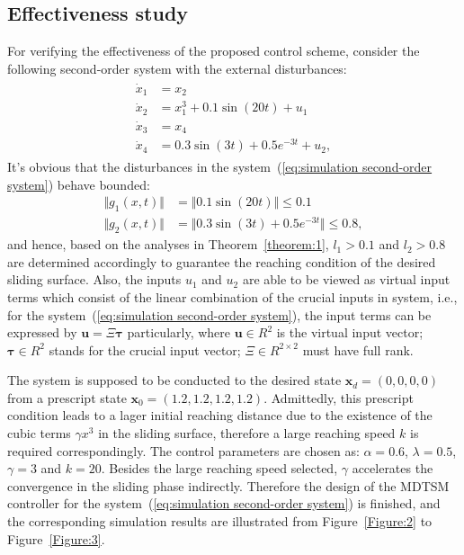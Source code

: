 \documentclass[3p]{elsarticle}
\theoremstyle{plain}
\theoremstyle{remark}
\begin{document}
\subsection{Effectiveness study}
For verifying the effectiveness of the proposed control scheme, consider the following second-order system with the external disturbances:
\begin{align}
\begin{split}
\dot x_1 &= x_2\\
\dot x_2 &= x_1^3+0.1\sin(20t)+u_1\\
\dot x_3 &= x_4\\
\dot x_4 &= 0.3\sin(3t)+0.5e^{-3t}+u_2,\label{eq:simulation second-order system}
\end{split}
\end{align}
It's obvious that the disturbances in the system~(\ref{eq:simulation second-order system}) behave bounded:
\begin{align*}
\Vert g_1(x,t)\Vert &= \Vert 0.1\sin(20t)\Vert\le 0.1\\
\Vert g_2(x,t)\Vert &= \Vert 0.3\sin(3t)+0.5e^{-3t}\Vert\le 0.8,
\end{align*}
and hence, based on the analyses in Theorem~\ref{theorem:1}, $l_1>0.1$ and $l_2>0.8$ are determined accordingly to guarantee the reaching condition of the desired sliding surface. Also, the inputs $u_1$ and $u_2$ are able to be viewed as virtual input terms which consist of the linear combination of the crucial inputs in system, i.e., for the system~(\ref{eq:simulation second-order system}), the input terms can be expressed by $\bm u = \Xi\bm\tau$ particularly, where $\bm u\in R^2$ is the virtual input vector; $\bm \tau\in R^2$ stands for the crucial input vector; $\Xi\in R^{2\times 2}$ must have full rank.\par
The system is supposed to be conducted to the desired state $\bm x_d=(0,0,0,0)$ from a prescript state $\bm x_0=(1.2,1.2,1.2,1.2)$. Admittedly, this prescript condition leads to a lager initial reaching distance due to the existence of the cubic terms $\gamma x^3$ in the sliding surface, therefore a large reaching speed $k$ is required correspondingly. The control parameters are chosen as: $\alpha = 0.6$, $\lambda = 0.5$, $\gamma = 3$ and $k = 20$. Besides the large reaching speed selected, $\gamma$ accelerates the convergence in the sliding phase indirectly. Therefore the design of the MDTSM controller for the system~(\ref{eq:simulation second-order system}) is finished, and the corresponding simulation results are illustrated from Figure~\ref{Figure:2} to Figure~\ref{Figure:3}.\par
\end{document}
